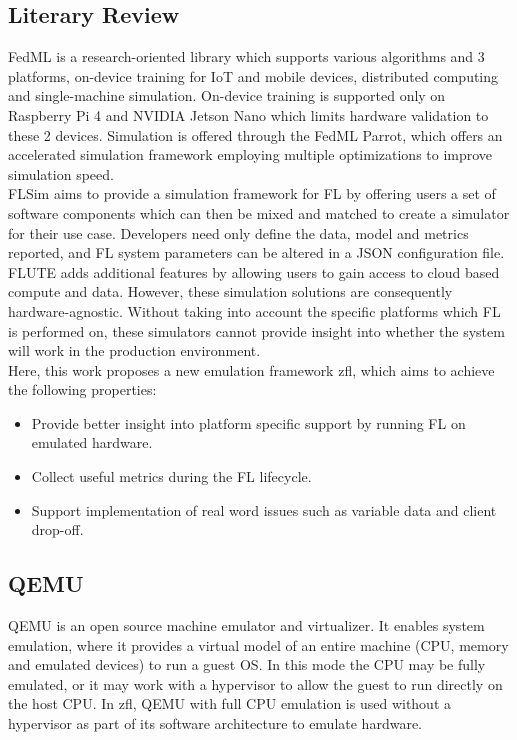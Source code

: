 \documentclass[12pt]{article}
\begin{document}
\subsection{Literary Review}
FedML\cite{he_2020_fedml} is a research-oriented library which supports various algorithms and 3 platforms, on-device training for IoT and
mobile devices, distributed computing and single-machine simulation. On-device training is supported
only on Raspberry Pi 4 and NVIDIA Jetson Nano which limits hardware validation to these 2 devices.
Simulation is offered through the FedML Parrot\cite{tang_2023_fedml}, which offers an accelerated simulation
framework employing multiple optimizations to improve simulation speed.\\

FLSim\cite{li_2021_flsim} aims to provide a simulation framework for FL by offering users a set of software components
which can then be mixed and matched to create a simulator for their use case. Developers need only
define the data, model and metrics reported, and FL system parameters can be altered in a JSON
configuration file. FLUTE\cite{garcia_2022_flute} adds additional features by allowing users to gain access to cloud based
compute and data. However, these simulation solutions are consequently hardware-agnostic. Without
taking into account the specific platforms which FL is performed on, these simulators cannot provide
insight into whether the system will work in the production environment.\\

Here, this work proposes a new emulation framework zfl, which aims to achieve the following
properties:
\begin{itemize}
  \item Provide better insight into platform specific support by running FL on emulated hardware.
  \item Collect useful metrics during the FL lifecycle.
  \item Support implementation of real word issues such as variable data and client drop-off.
\end{itemize}

\subsection{QEMU}
QEMU\cite{qemu} is an open source machine emulator and virtualizer. It enables system emulation, where it
provides a virtual model of an entire machine (CPU, memory and emulated devices) to run a guest OS.
In this mode the CPU may be fully emulated, or it may work with a hypervisor to allow the guest to
run directly on the host CPU. In zfl, QEMU with full CPU emulation is used without a hypervisor as
part of its software architecture to emulate hardware.
\end{document}
